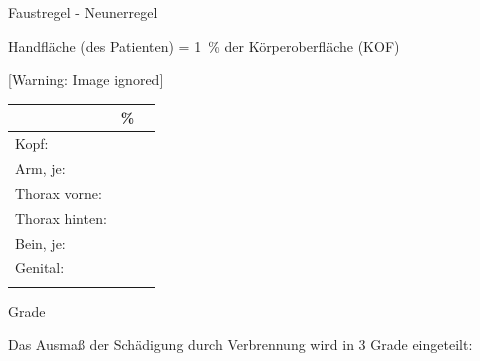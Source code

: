 \documentclass{article}
\begin{document}
Faustregel - Neunerregel

Handfl\"ache (des Patienten) = 1~\% der K\"orperoberfl\"ache (KOF)

\begin{center}
 [Warning: Image ignored] %

\end{center}
\begin{flushright}
\tablehead{}\begin{supertabular}{|m{2.134cm}|m{2.134cm}|m{2.134cm}|}
\hline
 &
\centering \%\par

 &
\\\hline
Kopf:

 &
\par

 &
\\\hline
Arm, je:

 &
\par

 &
\\\hline
Thorax vorne:

 &
\par

 &
\\\hline
Thorax hinten:

 &
\par

 &
\\\hline
Bein, je:

 &
\par

 &
\\\hline
Genital: 

 &
\par

 &
\\\hline
 &
 &
\\\hline
\end{supertabular}
\end{flushright}
Grade

Das Ausma{\ss} der Sch\"adigung durch Verbrennung wird in 3 Grade
eingeteilt:
\end{document}
